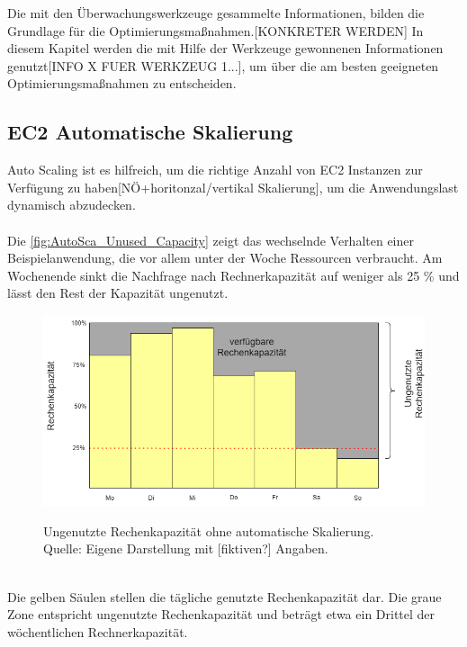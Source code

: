 Die mit den Überwachungswerkzeuge gesammelte Informationen, bilden die Grundlage für die Optimierungsmaßnahmen.[KONKRETER WERDEN]
In diesem Kapitel werden die mit Hilfe der Werkzeuge gewonnenen Informationen genutzt[INFO X FUER WERKZEUG 1...], um über die am besten geeigneten Optimierungsmaßnahmen zu entscheiden.

\subsection{EC2 Automatische Skalierung}
Auto Scaling ist es hilfreich, um die richtige Anzahl von EC2 Instanzen zur Verfügung zu haben[NÖ+horitonzal/vertikal Skalierung], um die Anwendungslast dynamisch abzudecken.
\\\\
Die \autoref{fig:AutoSca_Unused_Capacity} zeigt das wechselnde Verhalten einer Beispielanwendung, die vor allem unter der Woche Ressourcen verbraucht. Am Wochenende sinkt die Nachfrage nach Rechnerkapazität auf weniger als 25 \% und lässt den Rest der Kapazität ungenutzt. 
\begin{figure}[h]
    \centering
    \includegraphics[scale=0.5]{sources/AutoCap Unused Capacity}
    \caption[Ungenutzte Rechenkapazität ohne automatische Skalierung]{}
    \label{fig:AutoSca_Unused_Capacity} Ungenutzte Rechenkapazität ohne automatische Skalierung. \\
    Quelle: Eigene Darstellung mit [fiktiven?] Angaben. 
  \end{figure}\\
Die gelben Säulen stellen die tägliche genutzte Rechenkapazität dar.
Die graue Zone entspricht ungenutzte Rechenkapazität und beträgt etwa ein Drittel der wöchentlichen Rechnerkapazität.
